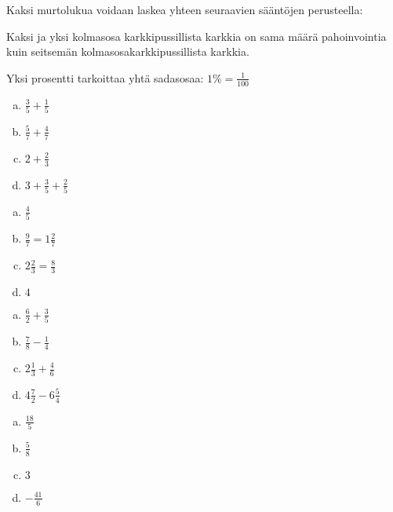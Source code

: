     Kaksi murtolukua voidaan laskea yhteen seuraavien sääntöjen perusteella:
    
    
    
    Kaksi ja yksi kolmasosa karkkipussillista karkkia on sama määrä pahoinvointia
    kuin seitsemän kolmasosakarkkipussillista karkkia.
    
    
    Yksi prosentti tarkoittaa yhtä sadasosaa: $1 \% = \frac{1}{100}$
    
    \begin{multicols}{2}
        \begin{tehtava}
            \begin{enumerate}[a)]
        	\item $\frac{3}{5} + \frac{1}{5}$
        	\item $\frac{5}{7} + \frac{4}{7}$
        	\item $2 + \frac{2}{3}$
        	\item$3 + \frac{3}{5} + \frac{2}{5}$   
            \end{enumerate}
            \begin{vastaus}
        		\begin{enumerate}[(a)]
        			\item $\frac{4}{5}$
        			\item $\frac{9}{7} = 1 \frac{2}{7}$
        			\item $2 \frac{2}{3} = \frac{8}{3}$
        			\item $4$
        		\end{enumerate}
            \end{vastaus}
        \end{tehtava}
        
        \begin{tehtava}
        
        \begin{enumerate}[a)]
        	\item $\frac{6}{2} + \frac{3}{5}$
        	\item $\frac{7}{8} - \frac{1}{4}$
        	\item $2 \frac{1}{3} + \frac{4}{6}$
        	\item $4 \frac{7}{2} - 6 \frac{5}{4}$
        \end{enumerate}
            \begin{vastaus}		
        		\begin{enumerate}[a)]
        			\item $\frac{18}{5}$
        			\item $\frac{5}{8}$
        			\item $3$
        			\item $-\frac{41}{6}$ 
        		\end{enumerate}
            \end{vastaus}
        \end{tehtava}
        

\end{multicols}

